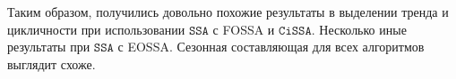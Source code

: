 \documentclass[12pt, specialist, subf
]{disser}
\theoremstyle{definition}
\newcommand{\SSA}{\texttt{SSA}}
\newcommand{\CISSA}{\texttt{CiSSA}}
\newcommand{\MSSA}{\texttt{MSSA}}
\newcommand{\DSSA}{\texttt{2d-SSA}}
\newcommand{\TS}{\mathsf{X}}
\begin{document}
Таким образом, получились довольно похожие результаты в выделении тренда и цикличности при использовании $\SSA$ с FOSSA и $\CISSA$. Несколько иные результаты при $\SSA$ с EOSSA. Сезонная составляющая для всех алгоритмов выглядит схоже.

\newpage














\end{document}
